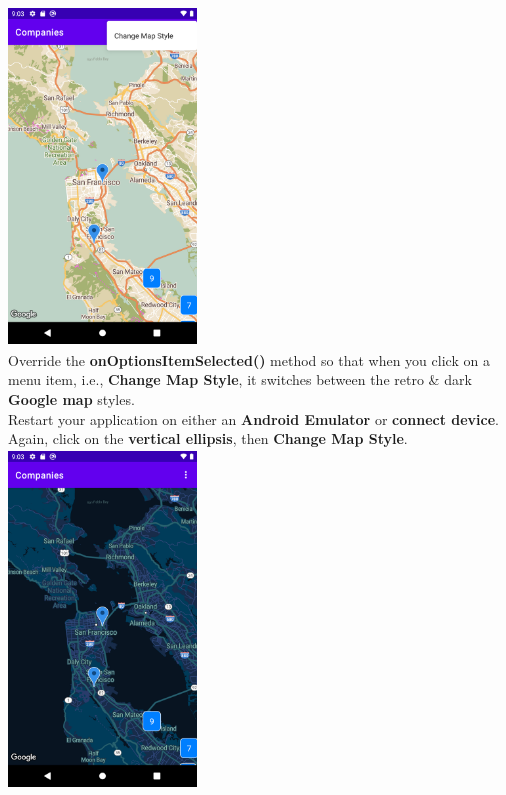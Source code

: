 \documentclass{article}
\begin{document}
\includegraphics[width=5cm, height=9cm]{../tex/img/practicals/05-companies-4.png}  \\

Override the \textbf{onOptionsItemSelected()} method so that when you click on a menu item, i.e., \textbf{Change Map Style}, it switches between the retro \& dark \textbf{Google map} styles. \\

Restart your application on either an \textbf{Android Emulator} or \textbf{connect device}. Again, click on the \textbf{vertical ellipsis}, then \textbf{Change Map Style}. \\ 

\includegraphics[width=5cm, height=9cm]{../tex/img/practicals/05-companies-5.png}
\end{document}
